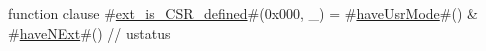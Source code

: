 function clause #\hyperref[sailRISCVzextzyiszyCSRzydefined]{ext\_is\_CSR\_defined}#(0x000, _) = #\hyperref[sailRISCVzhaveUsrMode]{haveUsrMode}#() & #\hyperref[sailRISCVzhaveNExt]{haveNExt}#() // ustatus
